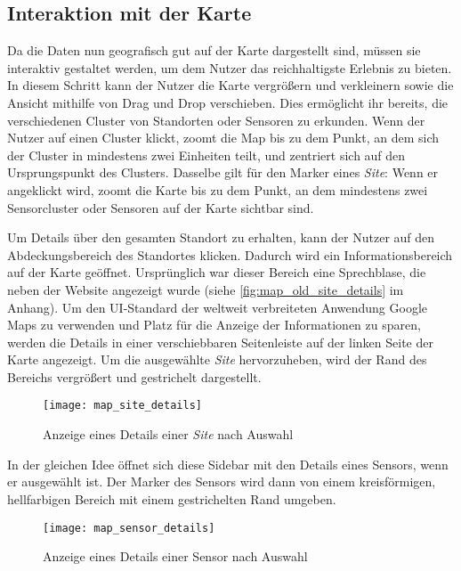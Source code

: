 \subsection{Interaktion mit der Karte} \label{sec:map_interaction}

Da die Daten nun geografisch gut auf der Karte dargestellt sind, müssen sie interaktiv gestaltet werden, um dem Nutzer das reichhaltigste Erlebnis zu bieten.
In diesem Schritt kann der Nutzer die Karte vergrößern und verkleinern sowie die Ansicht mithilfe von Drag und Drop verschieben.
Dies ermöglicht ihr bereits, die verschiedenen Cluster von Standorten oder Sensoren zu erkunden.
Wenn der Nutzer auf einen Cluster klickt, zoomt die Map bis zu dem Punkt, an dem sich der Cluster in mindestens zwei Einheiten teilt, und zentriert sich auf den Ursprungspunkt des Clusters.
Dasselbe gilt für den Marker eines \textit{Site}: Wenn er angeklickt wird, zoomt die Karte bis zu dem Punkt, an dem mindestens zwei Sensorcluster oder Sensoren auf der Karte sichtbar sind.

Um Details über den gesamten Standort zu erhalten, kann der Nutzer auf den Abdeckungsbereich des Standortes klicken.
Dadurch wird ein Informationsbereich auf der Karte geöffnet.
Ursprünglich war dieser Bereich eine Sprechblase, die neben der Website angezeigt wurde (siehe \ref{fig:map_old_site_details} im Anhang).
Um den UI-Standard der weltweit verbreiteten Anwendung Google Maps zu verwenden und Platz für die Anzeige der Informationen zu sparen, werden die Details in einer verschiebbaren Seitenleiste auf der linken Seite der Karte angezeigt.
Um die ausgewählte \textit{Site} hervorzuheben, wird der Rand des Bereichs vergrößert und gestrichelt dargestellt.

\begin{figure}[H]
  \centering
  \texttt{[image: map\_site\_details]}
  \caption{Anzeige eines Details einer \textit{Site} nach Auswahl}
  \label{fig:map_site_details}
\end{figure}

In der gleichen Idee öffnet sich diese Sidebar mit den Details eines Sensors, wenn er ausgewählt ist.
Der Marker des Sensors wird dann von einem kreisförmigen, hellfarbigen Bereich mit einem gestrichelten Rand umgeben.

\begin{figure}[H]
  \centering
  \texttt{[image: map\_sensor\_details]}
  \caption{Anzeige eines Details einer Sensor nach Auswahl}
  \label{fig:map_sensor_details}
\end{figure}

